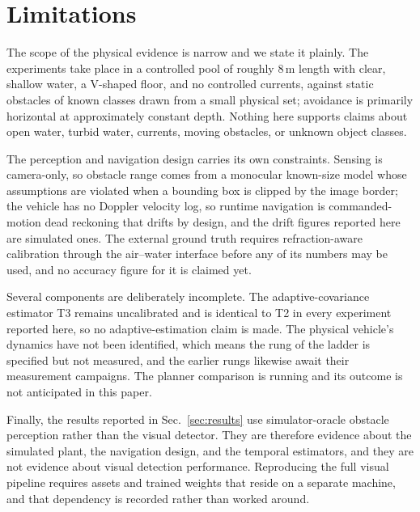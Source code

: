 \section{Limitations}
\label{sec:limitations}

The scope of the physical evidence is narrow and we state it plainly. The
experiments take place in a controlled pool of roughly 8\,m length with
clear, shallow water, a V-shaped floor, and no controlled currents, against
static obstacles of known classes drawn from a small physical set; avoidance
is primarily horizontal at approximately constant depth. Nothing here
supports claims about open water, turbid water, currents, moving obstacles,
or unknown object classes.

The perception and navigation design carries its own constraints. Sensing is
camera-only, so obstacle range comes from a monocular known-size model whose
assumptions are violated when a bounding box is clipped by the image border;
the vehicle has no Doppler velocity log, so runtime navigation is
commanded-motion dead reckoning that drifts by design, and the drift figures
reported here are simulated ones. The external ground truth requires
refraction-aware calibration through the air--water interface before any of
its numbers may be used, and no accuracy figure for it is claimed yet.

Several components are deliberately incomplete. The adaptive-covariance
estimator T3 remains uncalibrated and is identical to T2 in every experiment
reported here, so no adaptive-estimation claim is made. The physical
vehicle's dynamics have not been identified, which means the \STHREE{} rung
of the ladder is specified but not measured, and the earlier rungs likewise
await their measurement campaigns. The planner comparison is running and its
outcome is not anticipated in this paper.

Finally, the results reported in Sec.~\ref{sec:results} use simulator-oracle
obstacle perception rather than the visual detector. They are therefore
evidence about the simulated plant, the navigation design, and the temporal
estimators, and they are not evidence about visual detection performance.
Reproducing the full visual pipeline requires assets and trained weights that
reside on a separate machine, and that dependency is recorded rather than
worked around.
